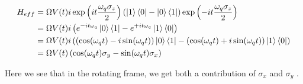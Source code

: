 \begin{fullwidth}
\begin{align}
    H_{eff} &= \Omega V(t) i \exp\left(it\frac{\omega_q \sigma_z}{2}\right)  (\ket{1}\bra{0} - \ket{0}\bra{1} )\exp\left(-it\frac{\omega_q \sigma_z}{2}\right) \\
            &= \Omega V(t) i \left(e^{-it\omega_q}\ket{0}\bra{1} -  e^{+it\omega_q}\ket{1}\bra{0} \right) \\
            &= \Omega V(t) i \left(\left(\cos(\omega_q t) - i\sin(\omega_q t)\right)\ket{0}\bra{1} -  \left(\cos(\omega_q t) + i\sin(\omega_q t)\right)\ket{1}\bra{0} \right) \\
            &= \Omega V(t) \left(\cos(\omega_q t)\sigma_y - \sin(\omega_q t) \sigma_x \right)
\end{align}
\end{fullwidth}
Here we see that in the rotating frame, we get both a contribution of $\sigma_x$ and $\sigma_y$ \cite{krantz_quantum_2019}. 

